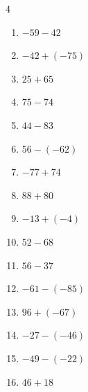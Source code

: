 \begin{multicols}{4}
\begin{enumerate}
        \phantom{$=155$}

  \item $-59-42$

        \phantom{$=-101$}

  \item $-42+(-75)$

        \phantom{$=-117$}

  \item $25+65$

        \phantom{$=90$}

  \item $75-74$

        \phantom{$=1$}

  \item $44-83$

        \phantom{$=-39$}

  \item $56-(-62)$

        \phantom{$=118$}

  \item $-77+74$

        \phantom{$=-3$}

  \item $88+80$

        \phantom{$=168$}

  \item $-13+(-4)$

        \phantom{$=-17$}

  \item $52-68$

        \phantom{$=-16$}

\columnbreak %

  \item $56-37$

        \phantom{$=19$}

  \item $-61-(-85)$

        \phantom{$=24$}

  \item $96+(-67)$

        \phantom{$=29$}

  \item $-27-(-46)$

        \phantom{$=19$}

  \item $-49-(-22)$

        \phantom{$=-27$}

  \item $46+18$


\end{enumerate}
\end{multicols}
